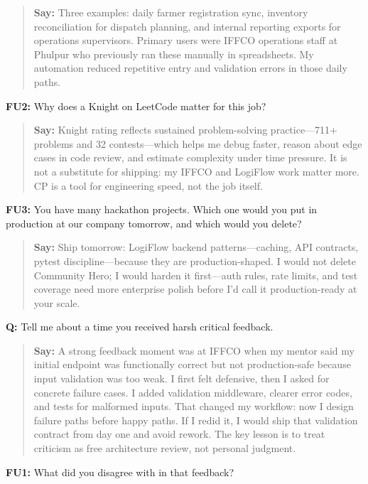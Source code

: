 \documentclass[9pt,a4paper]{article}
\begin{document}
\begin{quote}\small\textbf{Say:} Three examples: daily farmer registration sync, inventory reconciliation for dispatch planning, and internal reporting exports for operations supervisors. Primary users were IFFCO operations staff at Phulpur who previously ran these manually in spreadsheets. My automation reduced repetitive entry and validation errors in those daily paths.\end{quote}
\vspace{2mm}
\textbf{FU2:} Why does a Knight on LeetCode matter for this job?

\begin{quote}\small\textbf{Say:} Knight rating reflects sustained problem-solving practice---711+ problems and 32 contests---which helps me debug faster, reason about edge cases in code review, and estimate complexity under time pressure. It is not a substitute for shipping: my IFFCO and LogiFlow work matter more. CP is a tool for engineering speed, not the job itself.\end{quote}
\vspace{2mm}
\textbf{FU3:} You have many hackathon projects. Which one would you put in production at our company tomorrow, and which would you delete?

\begin{quote}\small\textbf{Say:} Ship tomorrow: LogiFlow backend patterns---caching, API contracts, pytest discipline---because they are production-shaped. I would not delete Community Hero; I would harden it first---auth rules, rate limits, and test coverage need more enterprise polish before I'd call it production-ready at your scale.\end{quote}
\vspace{2mm}
\textbf{Q:} Tell me about a time you received harsh critical feedback.

\begin{quote}\small\textbf{Say:} A strong feedback moment was at IFFCO when my mentor said my initial endpoint was functionally correct but not production-safe because input validation was too weak. I first felt defensive, then I asked for concrete failure cases. I added validation middleware, clearer error codes, and tests for malformed inputs. That changed my workflow: now I design failure paths before happy paths. If I redid it, I would ship that validation contract from day one and avoid rework. The key lesson is to treat criticism as free architecture review, not personal judgment.\end{quote}
\vspace{2mm}
\textbf{FU1:} What did you disagree with in that feedback?
\end{document}

